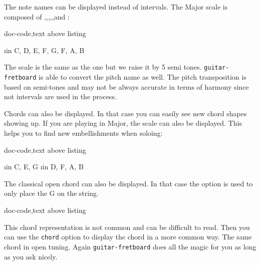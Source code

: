 \documentclass[a4paper]{article}
\newcommand{\pkg}[1]{\texttt{#1}}
\begin{document}
The note names can be displayed instead of intervals. The \pF Major scale is
composed of \pF,\pG,\pA,\pBb,\pC,\pD and \pE:

\begin{tcblisting}{doc-code,text above listing}
  \begin{fb}[frets before = 2, frets after = 2,
      transpose = 5,
      transpose pitch,
      legend text = {F Major scale (\pF, \pG, \pA, \pBb, \pC, \pD, \pE)},
      fret numbers visible]
    \foreach \i in { C, D, E, F, G, F, A, B} {
      \note[lower]{\i}
    }
  \end{fb}
\end{tcblisting}

The \pF scale is the same as the \pC one but we raise it by 5 semi
tones. \pkg{guitar-fretboard} is able to convert the pitch name as well. The
pitch transposition is based on semi-tones and may not be always accurate in
terms of harmony since not intervals are used in the process.

Chords can also be displayed. In that case you can easily see new \pC chord
shapes showing up. If you are playing in \pC Major, the scale can also be
displayed. This helps you to find new embellishments when soloing:

\begin{tcblisting}{doc-code,text above listing}
  \begin{fb}[frets before = 2, frets after = 2,
      legend text = {C Chord (and C major scale)},
      fret numbers visible]
    \foreach \i in {C, E, G} {
      \note{\i}
    }
    \foreach \i in {D, F, A, B} {
      \note[shade]{\i}
    }
  \end{fb}
\end{tcblisting}

The classical \pC open chord can also be displayed. In that case the
 option is used to only place the G on the  string.

\begin{tcblisting}{doc-code,text above listing}
  \begin{fb}[frets min = 0, frets max = 3,
      legend text = {\pC Chord},
      fret numbers visible]
      
  \end{fb}
\end{tcblisting}

This chord representation is not common and can be difficult to read. Then
you can use the \pkg{chord} option to display the chord in a more common
way. The same chord in open \pG{} tuning. Again \pkg{guitar-fretboard} does
all the magic for you as long as you ask nicely.
\end{document}
